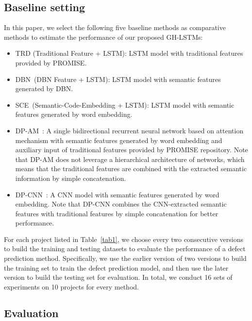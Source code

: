 \documentclass[journal]{IEEEtran}
\begin{document}
\subsection{Baseline setting}
In this paper, we select the following five baseline methods as comparative methods to estimate the performance of our proposed GH-LSTMs:
\begin{itemize}
	\item TRD (Traditional Feature + LSTM): LSTM model with traditional features provided by PROMISE.
	\item DBN~\cite{wang2018deep}(DBN Feature + LSTM): LSTM model with semantic features generated by DBN.
	\item SCE~\cite{liang2019seml}(Semantic-Code-Embedding + LSTM): LSTM model with semantic features generated by word embedding.
	\item DP-AM~\cite{fan2019deep}: A single bidirectional recurrent neural network based on attention mechanism with semantic features generated by word embedding and auxiliary input of traditional features provided by PROMISE repository. Note that DP-AM does not leverage a hierarchical architecture of networks, which means that the traditional features are combined with the extracted semantic information by simple concatenation.
	\item DP-CNN~\cite{jian2017dpcnn}: A CNN model with semantic features generated by word embedding. Note that DP-CNN combines the CNN-extracted semantic features with traditional features by simple concatenation for better performance.
\end{itemize}


For each project listed in Table~\ref{tab1}, we choose every two consecutive versions to build the training and testing datasets to evaluate the performance of a defect prediction method. Specifically, we use the earlier version of two versions to build the training set to train the defect prediction model, and then use the later version to build the testing set for evaluation. In total, we conduct 16 sets of experiments on 10 projects for every method.
\subsection{Evaluation}
\end{document}
